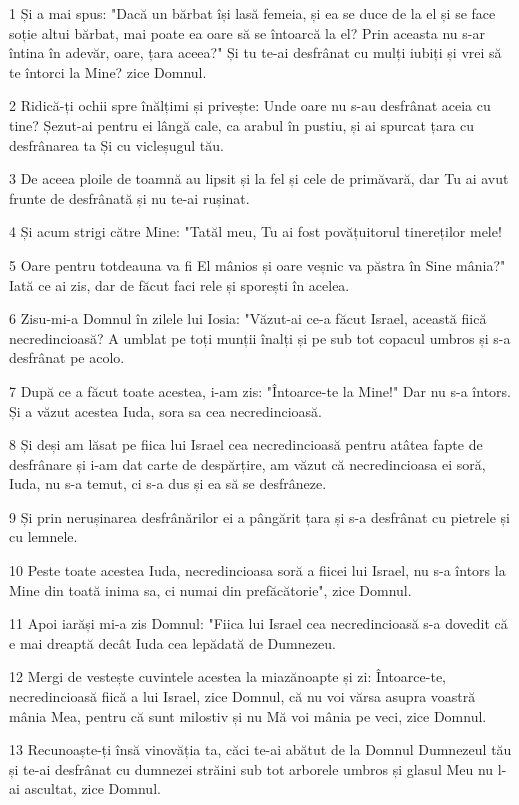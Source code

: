 \par 1 Și a mai spus: "Dacă un bărbat își lasă femeia, și ea se duce de la el și se face soție altui bărbat, mai poate ea oare să se întoarcă la el? Prin aceasta nu s-ar întina în adevăr, oare, țara aceea?" Și tu te-ai desfrânat cu mulți iubiți și vrei să te întorci la Mine? zice Domnul.
\par 2 Ridică-ți ochii spre înălțimi și privește: Unde oare nu s-au desfrânat aceia cu tine? Șezut-ai pentru ei lângă cale, ca arabul în pustiu, și ai spurcat țara cu desfrânarea ta Și cu vicleșugul tău.
\par 3 De aceea ploile de toamnă au lipsit și la fel și cele de primăvară, dar Tu ai avut frunte de desfrânată și nu te-ai rușinat.
\par 4 Și acum strigi către Mine: "Tatăl meu, Tu ai fost povățuitorul tinereților mele!
\par 5 Oare pentru totdeauna va fi El mânios și oare veșnic va păstra în Sine mânia?" Iată ce ai zis, dar de făcut faci rele și sporești în acelea.
\par 6 Zisu-mi-a Domnul în zilele lui Iosia: "Văzut-ai ce-a făcut Israel, această fiică necredincioasă? A umblat pe toți munții înalți și pe sub tot copacul umbros și s-a desfrânat pe acolo.
\par 7 După ce a făcut toate acestea, i-am zis: "Întoarce-te la Mine!" Dar nu s-a întors. Și a văzut acestea Iuda, sora sa cea necredincioasă.
\par 8 Și deși am lăsat pe fiica lui Israel cea necredincioasă pentru atâtea fapte de desfrânare și i-am dat carte de despărțire, am văzut că necredincioasa ei soră, Iuda, nu s-a temut, ci s-a dus și ea să se desfrâneze.
\par 9 Și prin nerușinarea desfrânărilor ei a pângărit țara și s-a desfrânat cu pietrele și cu lemnele.
\par 10 Peste toate acestea Iuda, necredincioasa soră a fiicei lui Israel, nu s-a întors la Mine din toată inima sa, ci numai din prefăcătorie", zice Domnul.
\par 11 Apoi iarăși mi-a zis Domnul: "Fiica lui Israel cea necredincioasă s-a dovedit că e mai dreaptă decât Iuda cea lepădată de Dumnezeu.
\par 12 Mergi de vestește cuvintele acestea la miazănoapte și zi: Întoarce-te, necredincioasă fiică a lui Israel, zice Domnul, că nu voi vărsa asupra voastră mânia Mea, pentru că sunt milostiv și nu Mă voi mânia pe veci, zice Domnul.
\par 13 Recunoaște-ți însă vinovăția ta, căci te-ai abătut de la Domnul Dumnezeul tău și te-ai desfrânat cu dumnezei străini sub tot arborele umbros și glasul Meu nu l-ai ascultat, zice Domnul.
